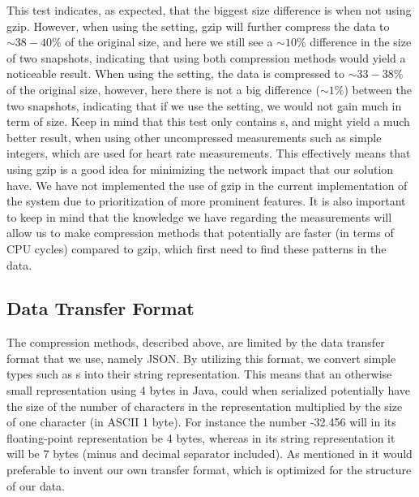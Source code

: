 This test indicates, as expected, that the biggest size difference is when not using gzip. However, when using the  setting, gzip will further compress the data to $\sim 38-40\%$ of the original size, and here we still see a $\sim 10\%$ difference in the size of two snapshots, indicating that using both compression methods would yield a noticeable result. When using the  setting, the data is compressed to $\sim 33-38\%$ of the original size, however, here there is not a big difference ($\sim 1\%$) between the two snapshots, indicating that if we use the  setting, we would not gain much in term of size. Keep in mind that this test only contains s, and might yield a much better result, when using other uncompressed measurements such as simple integers, which are used for heart rate measurements. This effectively means that using gzip is a good idea for minimizing the network impact that our solution have. We have not implemented the use of gzip in the current implementation of the system due to prioritization of more prominent features. It is also important to keep in mind that the knowledge we have regarding the measurements will allow us to make compression methods that potentially are faster (in terms of CPU cycles) compared to gzip, which first need to find these patterns in the data. 

\subsection{Data Transfer Format}
The compression methods, described above, are limited by the data transfer format that we use, namely JSON. By utilizing this format, we convert simple types such as s into their string representation. This means that an otherwise small representation using 4 bytes in Java, could when serialized potentially have the size of the number of characters in the representation multiplied by the size of one character (in ASCII 1 byte). For instance the number -32.456 will in its floating-point representation be 4 bytes, whereas in its string representation it will be 7 bytes (minus and decimal separator included). As mentioned in  it would preferable to invent our own transfer format, which is optimized for the structure of our data. 
